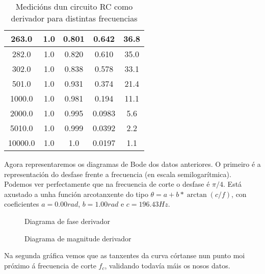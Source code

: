 \documentclass[12pt, a4paper, titlepage]{article}
\begin{document}
\begin{table}[H]
\begin{minipage}{0.49\textwidth}
\begin{tabular}{|c|c|c|c|c|}
          263.0   & 1.0 & 0.801   & 0.642   & 36.8          \\ \hline
          282.0   & 1.0 & 0.820   & 0.610   & 35.0          \\ \hline
          302.0   & 1.0 & 0.838   & 0.578   & 33.1          \\ \hline
          501.0   & 1.0 & 0.931   & 0.374   & 21.4          \\ \hline
          1000.0  & 1.0 & 0.981   & 0.194   & 11.1          \\ \hline
          2000.0  & 1.0 & 0.995   & 0.0983  & 5.6           \\ \hline
          5010.0  & 1.0 & 0.999   & 0.0392  & 2.2           \\ \hline
          10000.0 & 1.0 & 1.0     & 0.0197  & 1.1           \\ \hline
          \end{tabular}
      \end{minipage}
      \caption{Medicións dun circuito RC como derivador para distintas frecuencias}
    \end{table}

    Agora representaremos os diagramas de Bode dos datos anteriores.
    O primeiro é a representación do desfase frente a frecuencia (en escala semilogarítmica). Podemos ver perfectamente que na frecuencia de corte o desfase é $\pi/4$.
    Está axustado a unha función arcotanxente do tipo $\theta = a + b * \arctan(c/f)$, con coeficientes $a = 0.00 rad$, $b = 1.00 rad$ e $c = 196.43 Hz$.

    \begin{minipage}{0.49\textwidth}
      \centering
      \begin{figure}[H]
        \hspace{-32pt}
        \scalebox{0.65}{}
        \caption{Diagrama de fase derivador}
      \end{figure}
    \end{minipage}
    \begin{minipage}{0.49\textwidth}
      \centering
      \begin{figure}[H]
        \hspace{-16pt}
        \scalebox{0.65}{}
        \caption{Diagrama de magnitude derivador}
      \end{figure}
    \end{minipage}

    Na segunda gráfica vemos que as tanxentes da curva córtanse nun punto moi próximo á frecuencia de corte $f_c$, validando todavía máis os nosos datos.
\end{document}

